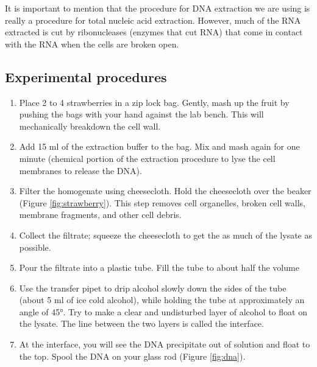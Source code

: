 It is important to mention that the procedure for DNA extraction we are
using is really a procedure for total nucleic acid extraction. However,
much of the RNA extracted is cut by ribonucleases (enzymes that cut RNA)
that come in contact with the RNA when the cells are broken open.

\subsection{Experimental procedures}\label{experimental-procedures-6}

\begin{enumerate}
\def\labelenumi{\arabic{enumi}.}
\tightlist
\item
  Place 2 to 4 strawberries in a zip lock bag. Gently, mash up the fruit
  by pushing the bags with your hand against the lab bench. This will
  mechanically breakdown the cell wall.
\item
  Add 15 ml of the extraction buffer to the bag. Mix and mash again for
  one minute (chemical portion of the extraction procedure to lyse the
  cell membranes to release the DNA).
\item
  Filter the homogenate using cheesecloth. Hold the cheesecloth over the
  beaker (Figure \ref{fig:strawberry}). This step removes cell
  organelles, broken cell walls, membrane fragments, and other cell
  debris.
\item
  Collect the filtrate; squeeze the cheesecloth to get the as much of
  the lysate as possible.
\item
  Pour the filtrate into a plastic tube. Fill the tube to about half the
  volume
\item
  Use the transfer pipet to drip alcohol slowly down the sides of the
  tube (about 5 ml of ice cold alcohol), while holding the tube at
  approximately an angle of 45°. Try to make a clear and undisturbed
  layer of alcohol to float on the lysate. The line between the two
  layers is called the interface.
\item
  At the interface, you will see the DNA precipitate out of solution and
  float to the top. Spool the DNA on your glass rod (Figure \ref{fig:dna}).
\end{enumerate}

